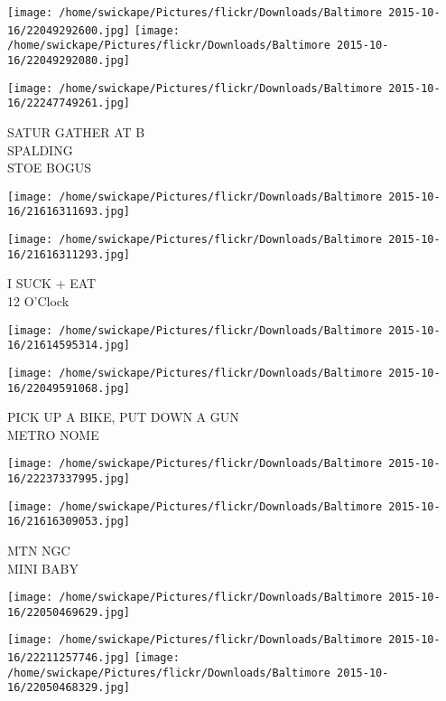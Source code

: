 \documentclass[10pt,letterpaper]{article}
\begin{document}
\texttt{[image: /home/swickape/Pictures/flickr/Downloads/Baltimore 2015-10-16/22049292600.jpg]}
\texttt{[image: /home/swickape/Pictures/flickr/Downloads/Baltimore 2015-10-16/22049292080.jpg]}

\vspace{0.25in}
\texttt{[image: /home/swickape/Pictures/flickr/Downloads/Baltimore 2015-10-16/22247749261.jpg]}

SATUR GATHER AT B\\
SPALDING\\
STOE BOGUS\\
\pagebreak

\texttt{[image: /home/swickape/Pictures/flickr/Downloads/Baltimore 2015-10-16/21616311693.jpg]}

\vspace{0.25in}
\texttt{[image: /home/swickape/Pictures/flickr/Downloads/Baltimore 2015-10-16/21616311293.jpg]}

I SUCK + EAT\\
12 O'Clock\\
\pagebreak

\texttt{[image: /home/swickape/Pictures/flickr/Downloads/Baltimore 2015-10-16/21614595314.jpg]}

\vspace{0.25in}
\texttt{[image: /home/swickape/Pictures/flickr/Downloads/Baltimore 2015-10-16/22049591068.jpg]}

PICK UP A BIKE, PUT DOWN A GUN\\
METRO NOME\\
\pagebreak

\texttt{[image: /home/swickape/Pictures/flickr/Downloads/Baltimore 2015-10-16/22237337995.jpg]}

\vspace{0.25in}
\texttt{[image: /home/swickape/Pictures/flickr/Downloads/Baltimore 2015-10-16/21616309053.jpg]}

MTN NGC\\
MINI BABY\\
\pagebreak

\texttt{[image: /home/swickape/Pictures/flickr/Downloads/Baltimore 2015-10-16/22050469629.jpg]}

\vspace{0.25in}
\texttt{[image: /home/swickape/Pictures/flickr/Downloads/Baltimore 2015-10-16/22211257746.jpg]}
\texttt{[image: /home/swickape/Pictures/flickr/Downloads/Baltimore 2015-10-16/22050468329.jpg]}
\end{document}
